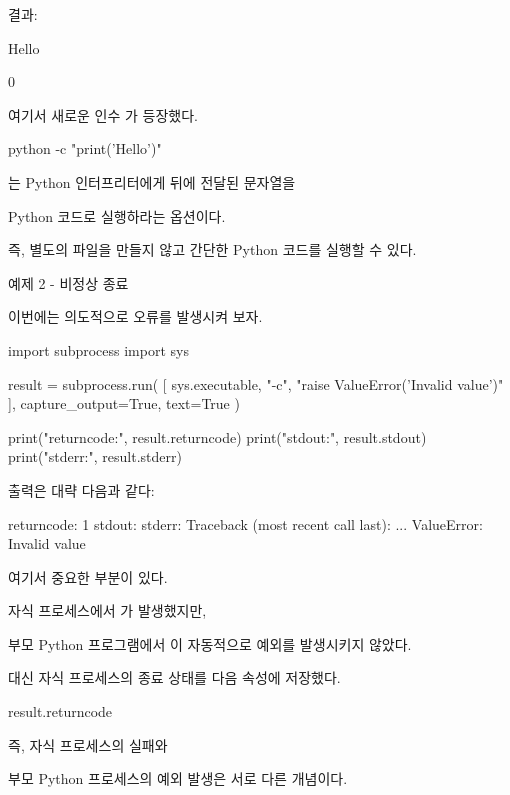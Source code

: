 결과:

\begin{dhkzsh}
Hello

0
\end{dhkzsh}

여기서 새로운 인수 가 등장했다.

\begin{dhkzsh}
python -c "print('Hello')"
\end{dhkzsh}

는 Python 인터프리터에게 뒤에 전달된 문자열을

Python 코드로 실행하라는 옵션이다.

즉, 별도의  파일을 만들지 않고 간단한 Python 코드를 실행할 수 있다.

\begin{dhknote}
\begin{dhksmry}[centered]
예제 2 - 비정상 종료
\end{dhksmry}
\end{dhknote}

이번에는 의도적으로 오류를 발생시켜 보자.

\begin{dhkcode}
import subprocess
import sys

result = subprocess.run(
    [
        sys.executable,
        "-c",
        "raise ValueError('Invalid value')"
    ],
    capture_output=True,
    text=True
)

print("returncode:", result.returncode)
print("stdout:", result.stdout)
print("stderr:", result.stderr)
\end{dhkcode}

출력은 대략 다음과 같다:

\begin{dhkzsh}
returncode: 1
stdout:
stderr: Traceback (most recent call last):
...
ValueError: Invalid value
\end{dhkzsh}

여기서 중요한 부분이 있다.

자식 프로세스에서 가 발생했지만,

부모 Python 프로그램에서 이 자동적으로 예외를 발생시키지 않았다.

대신 자식 프로세스의 종료 상태를 다음 속성에 저장했다.

\begin{dhkzsh}
result.returncode
\end{dhkzsh}

\begin{dhksmry}[centered]
즉, 자식 프로세스의 실패와 

부모 Python 프로세스의 예외 발생은 서로 다른 개념이다.
\end{dhksmry}

